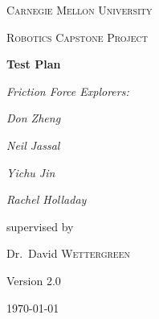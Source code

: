 \documentclass[a4paper,10pt]{article}
\begin{document}
\begin{titlepage}
	\centering
	{\scshape\LARGE Carnegie Mellon University \par}
	\vspace{1cm}
	{\scshape\Large Robotics Capstone Project\par}
	\vspace{1.5cm}
	{\huge\bfseries Test Plan\par}
	\vspace{2cm}
	{\Large\itshape Friction Force Explorers:\par}
	\vspace{1cm}
	{\Large\itshape Don Zheng\par}
	{\Large\itshape Neil Jassal\par}
	{\Large\itshape Yichu Jin\par}
	{\Large\itshape Rachel Holladay\par}
	\vfill
	supervised by\par
	Dr.~David \textsc{Wettergreen}

	\vfill

	{\large Version 2.0\par
	\today\par}
\end{titlepage}

\tableofcontents
\listoffigures
\clearpage


  




\pagebreak
\begin{appendices}

\end{appendices}

%
\end{document}
